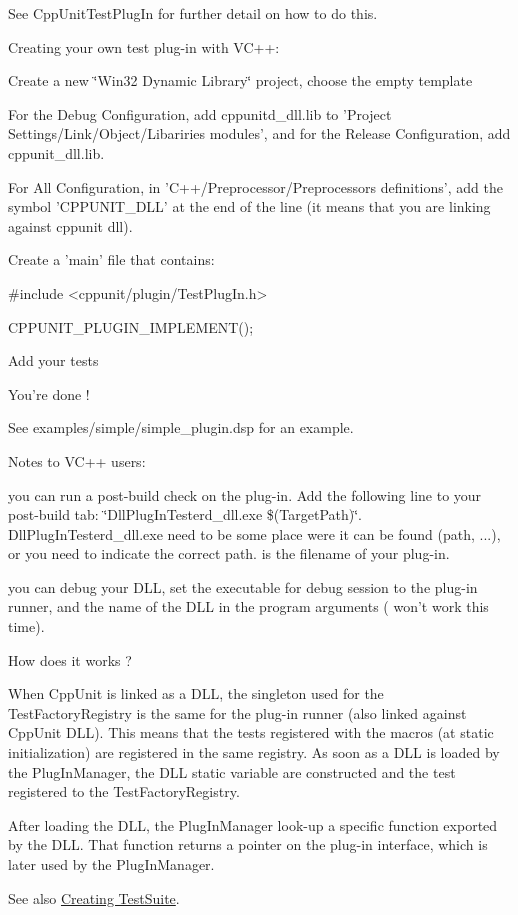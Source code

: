 See CppUnitTestPlugIn for further detail on how to do this.

Creating your own test plug-\/in with VC++:
\begin{DoxyItemize}
\item Create a new \char`\"{}Win32 Dynamic Library\char`\"{} project, choose the empty template
\item For the Debug Configuration, add cppunitd\_\-dll.lib to 'Project Settings/Link/Object/Libariries modules', and for the Release Configuration, add cppunit\_\-dll.lib.
\item For All Configuration, in 'C++/Preprocessor/Preprocessors definitions', add the symbol 'CPPUNIT\_\-DLL' at the end of the line (it means that you are linking against cppunit dll).
\item Create a 'main' file that contains: \begin{DoxyVerb}
#include <cppunit/plugin/TestPlugIn.h>

CPPUNIT_PLUGIN_IMPLEMENT();\end{DoxyVerb}

\item Add your tests
\item You're done !
\end{DoxyItemize}

See examples/simple/simple\_\-plugin.dsp for an example.

Notes to VC++ users:
\begin{DoxyItemize}
\item you can run a post-\/build check on the plug-\/in. Add the following line to your post-\/build tab: \char`\"{}DllPlugInTesterd\_\-dll.exe \$(TargetPath)\char`\"{}. DllPlugInTesterd\_\-dll.exe need to be some place were it can be found (path, ...), or you need to indicate the correct path.  is the filename of your plug-\/in.
\item you can debug your DLL, set the executable for debug session to the plug-\/in runner, and the name of the DLL in the program arguments ( won't work this time).
\end{DoxyItemize}

How does it works ?

When CppUnit is linked as a DLL, the singleton used for the TestFactoryRegistry is the same for the plug-\/in runner (also linked against CppUnit DLL). This means that the tests registered with the macros (at static initialization) are registered in the same registry. As soon as a DLL is loaded by the PlugInManager, the DLL static variable are constructed and the test registered to the TestFactoryRegistry.

After loading the DLL, the PlugInManager look-\/up a specific function exported by the DLL. That function returns a pointer on the plug-\/in interface, which is later used by the PlugInManager.

\begin{DoxySeeAlso}{See also}
\hyperlink{group___creating_test_suite}{Creating TestSuite}. 
\end{DoxySeeAlso}
